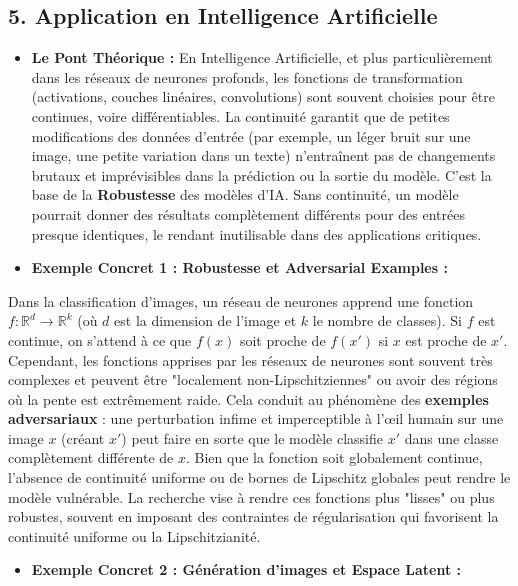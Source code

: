 \documentclass[12pt,a4paper]{report}
\begin{document}
\subsection{5. Application en Intelligence Artificielle}
\begin{itemize}
\item \textbf{Le Pont Théorique :} En Intelligence Artificielle, et plus particulièrement dans les réseaux de neurones profonds, les fonctions de transformation (activations, couches linéaires, convolutions) sont souvent choisies pour être continues, voire différentiables. La continuité garantit que de petites modifications des données d'entrée (par exemple, un léger bruit sur une image, une petite variation dans un texte) n'entraînent pas de changements brutaux et imprévisibles dans la prédiction ou la sortie du modèle. C'est la base de la \textbf{Robustesse} des modèles d'IA. Sans continuité, un modèle pourrait donner des résultats complètement différents pour des entrées presque identiques, le rendant inutilisable dans des applications critiques.
\item \textbf{Exemple Concret 1 : Robustesse et Adversarial Examples :}
\end{itemize}
    Dans la classification d'images, un réseau de neurones apprend une fonction $f: \mathbb{R}^d \to \mathbb{R}^k$ (où $d$ est la dimension de l'image et $k$ le nombre de classes). Si $f$ est continue, on s'attend à ce que $f(x)$ soit proche de $f(x')$ si $x$ est proche de $x'$. Cependant, les fonctions apprises par les réseaux de neurones sont souvent très complexes et peuvent être "localement non-Lipschitziennes" ou avoir des régions où la pente est extrêmement raide. Cela conduit au phénomène des \textbf{exemples adversariaux} : une perturbation infime et imperceptible à l'œil humain sur une image $x$ (créant $x'$) peut faire en sorte que le modèle classifie $x'$ dans une classe complètement différente de $x$. Bien que la fonction soit globalement continue, l'absence de continuité uniforme ou de bornes de Lipschitz globales peut rendre le modèle vulnérable. La recherche vise à rendre ces fonctions plus "lisses" ou plus robustes, souvent en imposant des contraintes de régularisation qui favorisent la continuité uniforme ou la Lipschitzianité.
\begin{itemize}
\item \textbf{Exemple Concret 2 : Génération d'images et Espace Latent :}
\end{itemize}
\end{document}
